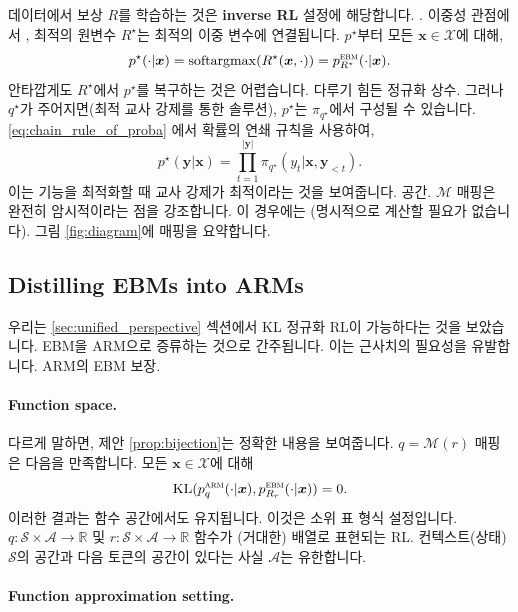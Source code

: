 \documentclass{article}
\def\x{{\bm{x}}}
\def\y{{\bm{y}}}
\def\RR{{\mathbb{R}}}
\def\cA{{\mathcal{A}}}
\def\cM{{\mathcal{M}}}
\def\cS{{\mathcal{S}}}
\def\cX{{\mathcal{X}}}
\newcommand{\Rsub}[1]{R_{#1}}
\def\arm{{\textsc{arm}}}
\def\ebm{{\textsc{ebm}}}
\def\KL{{\mathrm{KL}}}
\def\augvoc{\cA}
\begin{document}
데이터에서 보상 $R$를 학습하는 것은 \textbf{inverse RL} 설정에 해당합니다.
 \citep{ziebart2008maximum} .  이중성 관점에서 \citep{sander2025joint},
최적의 원변수 $R^\star$는 최적의 이중 변수에 연결됩니다.
 $p^\star$부터 모든 $\x \in \cX$에 대해,
 \begin{equation} 
p^ \star ( \cdot | \x ) 
= \mathrm{softargmax} (R^ \star ( \x , \cdot )) 
= p^ \ebm _{R^ \star }( \cdot | \x ). 
 \end{equation} 
안타깝게도 $R^\star$에서 $p^\star$를 복구하는 것은 어렵습니다.
다루기 힘든 정규화 상수.  그러나 $q^\star$가 주어지면(최적
교사 강제를 통한 솔루션), $p^\star$는 $\pi_{q^\star}$에서 구성될 수 있습니다. 
\eqref{eq:chain_rule_of_proba} 에서 확률의 연쇄 규칙을 사용하여,
 \begin{equation} \label{eq:p_star_from_q_star} 
p^ \star ( \y | \x ) = \prod _{t=1}^{| \y |} \pi _{q^ \star }(y_t | \x , \y _{<t}). 
 \end{equation} 
이는 기능을 최적화할 때 교사 강제가 최적이라는 것을 보여줍니다.
공간. $\cM$ 매핑은 완전히 암시적이라는 점을 강조합니다.
이 경우에는 (명시적으로 계산할 필요가 없습니다).
그림 \ref{fig:diagram}에 매핑을 요약합니다.

\subsection{Distilling EBMs into ARMs}

우리는 \ref{sec:unified_perspective} 섹션에서 KL 정규화 RL이 가능하다는 것을 보았습니다.
EBM을 ARM으로 증류하는 것으로 간주됩니다.  이는 근사치의 필요성을 유발합니다.
ARM의 EBM 보장.

\paragraph{Function space.}

다르게 말하면, 제안 \ref{prop:bijection}는 정확한 내용을 보여줍니다.
$q = \cM(r)$ 매핑은 다음을 만족합니다.
모든 $\x \in \cX$에 대해  
 \begin{equation} 
 \KL (p^ \arm _q( \cdot | \x ), p^ \ebm _{ \Rsub{r} }( \cdot | \x )) = 0.
 \end{equation} 
이러한 결과는 함수 공간에서도 유지됩니다.  이것은 소위 표 형식 설정입니다.
$q \colon \cS \times \augvoc \to \RR$ 및 $r \colon \cS
\times \augvoc \to \RR$ 함수가 (거대한) 배열로 표현되는 RL.
컨텍스트(상태) $\cS$의 공간과 다음 토큰의 공간이 있다는 사실
 $\augvoc$는 유한합니다.

\paragraph{Function approximation setting.}
\end{document}
